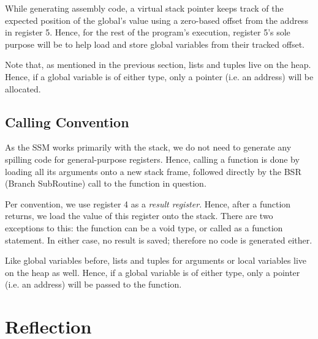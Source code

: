 While generating assembly code, a virtual stack pointer keeps track of the expected position of the global's value using a zero-based offset from the address in register 5.
Hence, for the rest of the program's execution, register 5's sole purpose will be to help load and store global variables from their tracked offset.

Note that, as mentioned in the previous section, lists and tuples live on the heap.
Hence, if a global variable is of either type, only a pointer (i.e. an address) will be allocated.


\subsection{Calling Convention}

As the SSM works primarily with the stack, we do not need to generate any spilling code for general-purpose registers.
Hence, calling a function is done by loading all its arguments onto a new stack frame, followed directly by the BSR (Branch SubRoutine) call to the function in question.

Per convention, we use register 4 as a \emph{result register}.
Hence, after a function returns, we load the value of this register onto the stack.
There are two exceptions to this: the function can be a void type, or called as a function statement.
In either case, no result is saved; therefore no code is generated either.

Like global variables before, lists and tuples for arguments or local variables live on the heap as well.
Hence, if a global variable is of either type, only a pointer (i.e. an address) will be passed to the function.


\section{Reflection}


